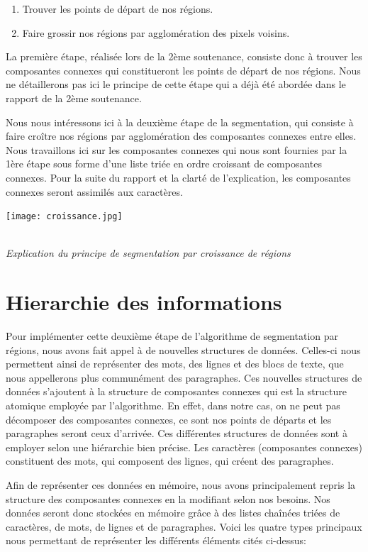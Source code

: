 \documentclass[a4paper,12pt]{report}
\begin{document}
\begin{enumerate}
\item Trouver les points de départ de nos régions.
\item Faire grossir nos régions par agglomération des pixels voisins.
\end{enumerate}

La première étape, réalisée lors de la 2ème soutenance, consiste donc à trouver les
composantes connexes qui constitueront les points de départ de nos régions. Nous ne
détaillerons pas ici le principe de cette étape qui a déjà été abordée dans le rapport de la
2ème soutenance.

Nous nous intéressons ici à la deuxième étape de la segmentation, qui consiste à faire
croître nos régions par agglomération des composantes connexes entre elles. Nous
travaillons ici sur les composantes connexes qui nous sont fournies par la 1ère étape sous
forme d'une liste triée en ordre croissant de composantes connexes. Pour la suite du
rapport et la clarté de l'explication, les composantes connexes seront
assimilés aux caractères.

\begin{center}
  \texttt{[image: croissance.jpg]}
  \caption{\\\emph{Explication du principe de segmentation par croissance de r\'egions}}
\end{center}



\section{Hierarchie des informations}

Pour implémenter cette deuxième étape de l'algorithme de segmentation par régions,
nous avons fait appel à de nouvelles structures de données. Celles-ci nous permettent
ainsi de représenter des mots, des lignes et des blocs de texte, que nous appellerons plus
communément des paragraphes. Ces nouvelles structures de données s'ajoutent à la
structure de composantes connexes qui est la structure atomique employée par
l'algorithme. En effet, dans notre cas, on ne peut pas décomposer des composantes
connexes, ce sont nos points de départs et les paragraphes seront ceux d'arrivée. Ces
différentes structures de données sont à employer selon une hiérarchie bien précise. Les
caractères (composantes connexes) constituent des mots, qui composent des lignes, qui
créent des paragraphes.

Afin de représenter ces données en mémoire, nous avons principalement repris la
structure des composantes connexes en la modifiant selon nos besoins. Nos données seront
donc stockées en mémoire grâce à des listes chaînées triées de caractères, de mots, de
lignes et de paragraphes. Voici les quatre types principaux nous permettant de représenter
les différents éléments cités ci-dessus:
\end{document}
